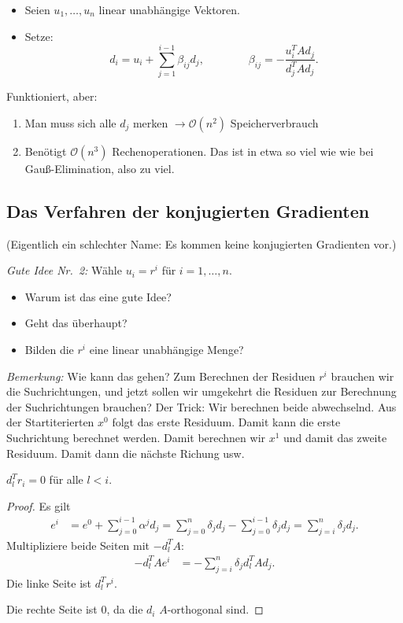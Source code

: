 \begin{itemize}
 \item Seien $u_1,\ldots,u_n$ linear unabhängige Vektoren.
 \item Setze:
  \begin{equation}
    \label{equa:eqschmidt1}
   d_i=u_i+\sum_{j=1}^{i-1} \beta_{ij}d_j, \qquad \qquad \beta_{ij}=-\frac{u_i^TAd_j}{d_j^TAd_j}.
  \end{equation}
\end{itemize}
Funktioniert, aber:
\begin{enumerate}
 \item Man muss sich alle $d_j$ merken $\longrightarrow \mathcal{O} (n^2)$ Speicherverbrauch
 \item Benötigt $\mathcal{O} (n^3)$ Rechenoperationen.  Das ist in etwa so viel wie
   wie bei Gauß-Elimination, also zu viel.
\end{enumerate}

\subsection{Das Verfahren der konjugierten Gradienten}

(Eigentlich ein schlechter Name: Es kommen keine konjugierten Gradienten vor.)

\bigskip

\emph{Gute Idee Nr.~2:} Wähle $u_i=r^i$ für $i=1,\ldots,n$.
\begin{itemize}
\item Warum ist das eine gute Idee?
\item Geht das überhaupt?
\item Bilden die $r^i$ eine linear unabhängige Menge?
\end{itemize}

\emph{Bemerkung:} Wie kann das gehen?  Zum Berechnen der Residuen $r^i$ brauchen wir die
Suchrichtungen, und jetzt sollen wir umgekehrt die Residuen zur Berechnung der Suchrichtungen
brauchen?  Der Trick: Wir berechnen beide abwechselnd.  Aus der Startiterierten $x^0$ folgt
das erste Residuum.  Damit kann die erste Suchrichtung berechnet werden.  Damit berechnen
wir $x^1$ und damit das zweite Residuum.  Damit dann die nächste Richung usw.

\begin{lemma}
$d_l^Tr_i=0$ für alle $l<i$.
\end{lemma}
\begin{proof}
Es gilt
\begin{align*}
 e^i & =e^0+\sum_{j=0}^{i-1} \alpha^jd_j=\sum_{j=0}^n \delta_jd_j-\sum_{j=0}^{i-1} \delta_jd_j=\sum_{j=i}^{n} \delta_jd_j.
\end{align*}
Multipliziere beide Seiten mit $-d_l^TA$:
\begin{align*}
 -d_l^TAe^i & =-\sum_{j=i}^n \delta_jd_l^TAd_j.
\end{align*}
Die linke Seite ist $d_l^T r^i$.

Die rechte Seite ist $0$, da die $d_i$ $A$-orthogonal sind.
\end{proof}


